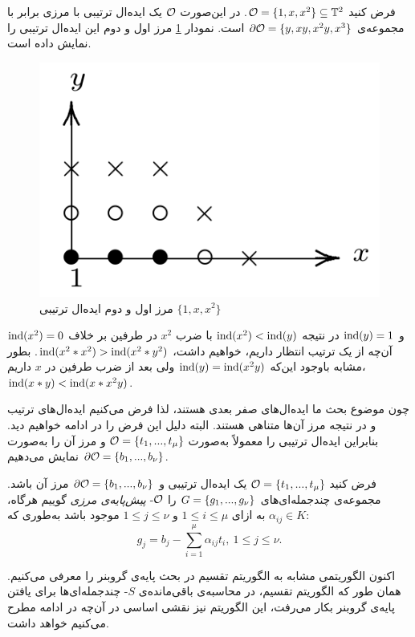 \begin{example}
فرض کنید
${\mathcal O} = \{1,x,x^{2}\}\subseteq \mathbb{T}^{2}$.
در این‌صورت 
${\mathcal O}$
یک ایده‌ال ترتیبی با مرزی برابر با مجموعه‌ی 
$\partial\mathcal{O} = \{y,xy,x^{2}y,x^{3}\}$
است. نمودار
\ref{fig:border2}
مرز اول و دوم این ایده‌ال ترتیبی را نمایش داده است.
\begin{figure}[H]
\centering
\includegraphics[width=0.4\linewidth]{Images/border2}
\caption{مرز اول و دوم ایده‌ال ترتیبی
	$\{1,x,x^{2}\}$}
\label{fig:border2}
\end{figure}
$\operatorname{\mathrm{ind}}(x^{2}) = 0$
و
$\operatorname{\mathrm{ind}}(y) = 1$
در نتیجه 
$\operatorname{\mathrm{ind}}(x^{2}) < \operatorname{\mathrm{ind}}(y)$
با ضرب 
$x^{2}$
در طرفین بر خلاف آن‌چه از یک ترتیب انتظار داریم، خواهیم داشت، 
$\operatorname{\mathrm{ind}}(x^{2}*x^{2}) > \operatorname{\mathrm{ind}}(x^{2}*y^{2})$.
بطور مشابه باوجود این‌که 
$\operatorname{\mathrm{ind}}(y) = \operatorname{\mathrm{ind}}(x^{2}y)$
ولی بعد از ضرب طرفین در 
$x$
داریم، 
$\operatorname{\mathrm{ind}}(x*y) < \operatorname{\mathrm{ind}}(x*x^{2}y)$.
\end{example}
چون موضوع بحث ما ایده‌ال‌های صفر بعدی هستند، لذا فرض می‌کنیم ایده‌‌ال‌های ترتیب و در نتیجه مرز آن‌ها متناهی هستند. البته دلیل این فرض را در ادامه خواهیم دید. بنابراین ایده‌ال ترتیبی را معمولاً به‌صورت 
${\mathcal O} = \{t_{1},...,t_{\mu}\}$
و مرز آن را به‌صورت 
$\partial\mathcal{O} = \{b_{1},...,b_{\nu}\}$
نمایش می‌دهیم. 

\begin{definition}
فرض کنید 
${\mathcal O} = \{t_{1},...,t_{\mu}\}$
یک ایده‌ال ترتیبی و 
$\partial\mathcal{O} = \{b_{1},...,b_{\nu}\}$
مرز آن باشد.  مجموعه‌ی چندجمله‌ای‌های 	
$G = \{g_{1},...,g_{\nu}\}$
را 
${\mathcal O}$-
\textit{پیش‌پایه‌ی مرزی}
 گوییم هرگاه، 
 $\alpha_{ij}\in K$
 به ازای 
 $1\leq i\leq \mu$
 و 
 $1\leq j\leq \nu$
 موجود باشد به‌طوری که:
 $$g_{j} = b_{j} - \sum_{i = 1}^{\mu}\alpha_{ij}t_{i}, \ 1\leq j\leq \nu.$$
\end{definition}
اکنون الگوریتمی مشابه به الگوریتم تقسیم در بحث پایه‌ی گروبنر را معرفی می‌کنیم. همان طور که الگوریتم تقسیم، در محاسبه‌ی باقی‌مانده‌ی 
$S$-
چندجمله‌ای‌ها برای یافتن پایه‌ی گروبنر بکار می‌رفت، این الگوریتم نیز نقشی اساسی در آن‌چه در ادامه مطرح می‌کنیم خواهد داشت.

